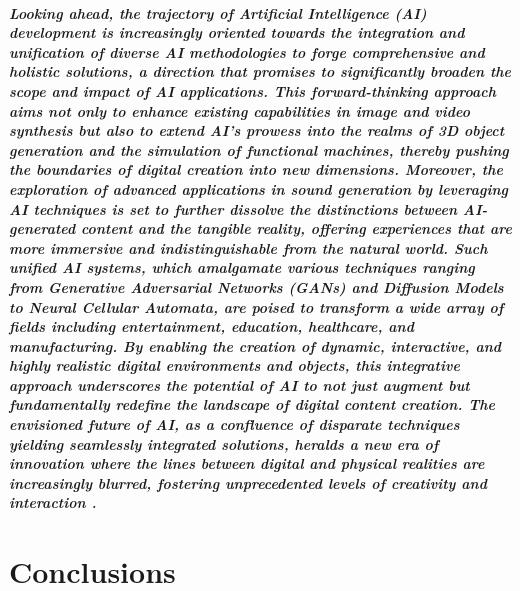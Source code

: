 \documentclass[11pt,a4paper,oneside]{report}
\begin{document}
\paragraph{Looking ahead, the trajectory of Artificial Intelligence (AI) development is increasingly oriented towards the integration and unification of diverse AI methodologies to forge comprehensive and holistic solutions, a direction that promises to significantly broaden the scope and impact of AI applications. This forward-thinking approach aims not only to enhance existing capabilities in image and video synthesis but also to extend AI's prowess into the realms of 3D object generation and the simulation of functional machines, thereby pushing the boundaries of digital creation into new dimensions. Moreover, the exploration of advanced applications in sound generation by leveraging AI techniques is set to further dissolve the distinctions between AI-generated content and the tangible reality, offering experiences that are more immersive and indistinguishable from the natural world. Such unified AI systems, which amalgamate various techniques ranging from Generative Adversarial Networks (GANs) and Diffusion Models to Neural Cellular Automata, are poised to transform a wide array of fields including entertainment, education, healthcare, and manufacturing. By enabling the creation of dynamic, interactive, and highly realistic digital environments and objects, this integrative approach underscores the potential of AI to not just augment but fundamentally redefine the landscape of digital content creation. The envisioned future of AI, as a confluence of disparate techniques yielding seamlessly integrated solutions, heralds a new era of innovation where the lines between digital and physical realities are increasingly blurred, fostering unprecedented levels of creativity and interaction \cite{esser2022towards}.}


\chapter{Conclusions}
\label{conclusions}
\end{document}
